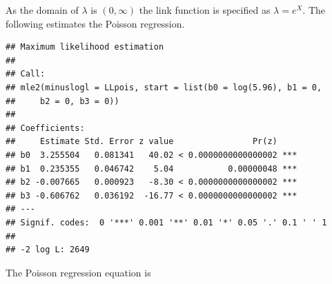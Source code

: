 \documentclass[
]{article}
\newenvironment{Shaded}{\begin{snugshade}}{\end{snugshade}}
\newcommand{\AttributeTok}[1]{\textcolor[rgb]{0.77,0.63,0.00}{#1}}
\newcommand{\ControlFlowTok}[1]{\textcolor[rgb]{0.13,0.29,0.53}{\textbf{#1}}}
\newcommand{\DecValTok}[1]{\textcolor[rgb]{0.00,0.00,0.81}{#1}}
\newcommand{\FloatTok}[1]{\textcolor[rgb]{0.00,0.00,0.81}{#1}}
\newcommand{\FunctionTok}[1]{\textcolor[rgb]{0.00,0.00,0.00}{#1}}
\newcommand{\NormalTok}[1]{#1}
\newcommand{\OtherTok}[1]{\textcolor[rgb]{0.56,0.35,0.01}{#1}}
\newcommand{\SpecialCharTok}[1]{\textcolor[rgb]{0.00,0.00,0.00}{#1}}
\begin{document}
As the domain of \(\lambda\) is \((0,\infty)\) the link function is
specified as \(\lambda = e^X\). The following estimates the Poisson
regression.

\begin{Shaded}
\end{Shaded}

\begin{verbatim}
## Maximum likelihood estimation
## 
## Call:
## mle2(minuslogl = LLpois, start = list(b0 = log(5.96), b1 = 0, 
##     b2 = 0, b3 = 0))
## 
## Coefficients:
##     Estimate Std. Error z value                Pr(z)    
## b0  3.255504   0.081341   40.02 < 0.0000000000000002 ***
## b1  0.235355   0.046742    5.04           0.00000048 ***
## b2 -0.007665   0.000923   -8.30 < 0.0000000000000002 ***
## b3 -0.606762   0.036192  -16.77 < 0.0000000000000002 ***
## ---
## Signif. codes:  0 '***' 0.001 '**' 0.01 '*' 0.05 '.' 0.1 ' ' 1
## 
## -2 log L: 2649
\end{verbatim}

The Poisson regression equation is
\end{document}
